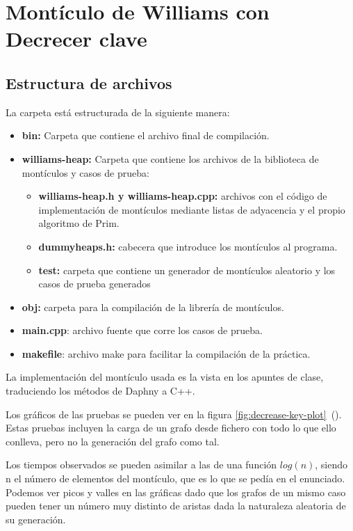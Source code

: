 \section{Montículo de Williams con Decrecer clave}
 {\small
  \subsection{Estructura de archivos}
  La carpeta está estructurada de la siguiente manera:
  \begin{itemize}
      \item\textbf{bin:} Carpeta que contiene el archivo final de compilación.
      \item\textbf{williams-heap:} Carpeta que contiene los archivos de la biblioteca de montículos y casos de prueba:
      \begin{itemize}
          \item\textbf{williams-heap.h y williams-heap.cpp:} archivos con el código de implementación de montículos mediante listas de adyacencia y el propio algoritmo de Prim.
          \item\textbf{dummyheaps.h:} cabecera que introduce los montículos al programa.
          \item\textbf{test:} carpeta que contiene un generador de montículos aleatorio y los casos de prueba generados
      \end{itemize}
      \item\textbf{obj:} carpeta para la compilación de la librería de montículos.
      \item\textbf{main.cpp}: archivo fuente que corre los casos de prueba.
      \item\textbf{makefile}: archivo make para facilitar la compilación de la práctica.
  \end{itemize}

  La implementación del montículo usada es la vista en los apuntes de clase, traduciendo los métodos de Daphny a C++.


  Los gráficos de las pruebas se pueden ver en la figura \ref{fig:decrease-key-plot}~(). Estas pruebas incluyen la carga de un grafo desde fichero con todo lo que ello conlleva, pero no la generación del grafo como tal.

  Los tiempos observados se pueden asimilar a las de una función $log(n)$, siendo n el número de elementos del montículo, que es lo que se pedía en el enunciado. Podemos ver picos y valles en las gráficas dado que los grafos de un mismo caso pueden tener un número muy distinto de aristas dada la naturaleza aleatoria de su generación.
 }
